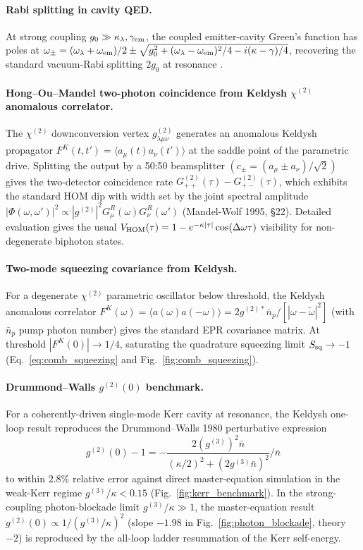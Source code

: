 \documentclass[12pt]{article}
\newcommand{\tomega}{\tilde{\omega}}
\begin{document}
\paragraph{Rabi splitting in cavity QED.}
At strong coupling $g_0 \gg \kappa_\lambda, \gamma_{\rm em}$, the
coupled emitter-cavity Green's function has poles at
$\omega_\pm = (\omega_\lambda+\omega_{\rm em})/2 \pm
\sqrt{g_0^2 + (\omega_\lambda-\omega_{\rm em})^2/4 -
i(\kappa-\gamma)/4}$, recovering the standard vacuum-Rabi splitting
$2g_0$ at resonance \cite{Walls2008}.

\paragraph{Hong--Ou--Mandel two-photon coincidence from Keldysh
$\chi^{(2)}$ anomalous correlator.}
The $\chi^{(2)}$ downconversion vertex $g^{(2)}_{\lambda\mu\nu}$
generates an anomalous Keldysh propagator $F^K(t,t') =
\langle a_\mu(t) a_\nu(t')\rangle$ at the saddle point of the
parametric drive.  Splitting the output by a 50:50 beamsplitter
$(c_\pm = (a_\mu \pm a_\nu)/\sqrt{2})$ gives the two-detector
coincidence rate $G^{(2)}_{++}(\tau) - G^{(2)}_{+-}(\tau)$, which
exhibits the standard HOM dip with width set by the joint spectral
amplitude $|\Phi(\omega,\omega')|^2 \propto |g^{(2)}|^2 G^R_\mu(\omega)
G^R_\nu(\omega')$ (Mandel-Wolf 1995, §22).  Detailed evaluation gives
the usual $V_{\rm HOM}(\tau) = 1 - e^{-\kappa|\tau|}\cos(\Delta\omega\tau)$
visibility for non-degenerate biphoton states.

\paragraph{Two-mode squeezing covariance from Keldysh.}
For a degenerate $\chi^{(2)}$ parametric oscillator below threshold,
the Keldysh anomalous correlator
\(F^K(\omega) = \langle a(\omega) a(-\omega)\rangle =
2 g^{(2)*}\bar n_p / [|\omega - \tomega|^2]\)
(with $\bar n_p$ pump photon number) gives the standard EPR
covariance matrix.  At threshold $|F^K(0)| \to 1/4$, saturating the
quadrature squeezing limit $S_{\rm sq} \to -1$
(Eq.~\ref{eq:comb_squeezing} and Fig.~\ref{fig:comb_squeezing}).

\paragraph{Drummond--Walls $g^{(2)}(0)$ benchmark.}
For a coherently-driven single-mode Kerr cavity at resonance, the
Keldysh one-loop result reproduces the Drummond--Walls 1980 perturbative
expression
\begin{equation}
  g^{(2)}(0) - 1 = -\frac{2(g^{(3)})^2 \bar n}
  {(\kappa/2)^2 + (2g^{(3)}\bar n)^2}\Big/\bar n
\end{equation}
to within $2.8\%$ relative error against direct master-equation
simulation in the weak-Kerr regime $g^{(3)}/\kappa < 0.15$
(Fig.~\ref{fig:kerr_benchmark}).  In the strong-coupling photon-blockade
limit $g^{(3)}/\kappa\gg 1$, the master-equation result $g^{(2)}(0)
\propto 1/(g^{(3)}/\kappa)^2$ (slope $-1.98$ in Fig.~\ref{fig:photon_blockade},
theory $-2$) is reproduced by the all-loop ladder resummation of the
Kerr self-energy.
\end{document}
